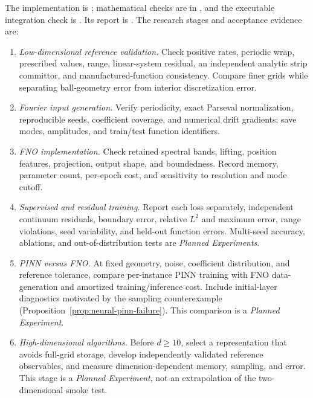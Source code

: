 \documentclass[12pt,a4paper,oneside]{book}
\begin{document}
The implementation is ; mathematical checks are in
, and the executable integration check is
. Its report is .
The research stages and acceptance evidence are:
\begin{enumerate}
 \item \emph{Low-dimensional reference validation.} Check positive rates, periodic wrap, prescribed values, range,
 linear-system residual, an independent analytic strip committor, and manufactured-function consistency.
 Compare finer grids while separating ball-geometry error from interior discretization error.
 \item \emph{Fourier input generation.} Verify periodicity, exact Parseval normalization, reproducible seeds,
 coefficient coverage, and numerical drift gradients; save modes, amplitudes, and train/test function identifiers.
 \item \emph{FNO implementation.} Check retained spectral bands, lifting, position features, projection, output shape,
 and boundedness. Record memory, parameter count, per-epoch cost, and sensitivity to resolution and mode cutoff.
 \item \emph{Supervised and residual training.} Report each loss separately, independent continuum residuals,
 boundary error, relative $L^2$ and maximum error, range violations, seed variability, and held-out function errors.
 Multi-seed accuracy, ablations, and out-of-distribution tests are \emph{Planned Experiments}.
 \item \emph{PINN versus FNO.} At fixed geometry, noise, coefficient distribution, and reference tolerance, compare
 per-instance PINN training with FNO data-generation and amortized training/inference cost. Include initial-layer
 diagnostics motivated by the sampling counterexample (Proposition~\ref{prop:neural-pinn-failure}).
 This comparison is a \emph{Planned Experiment}.
 \item \emph{High-dimensional algorithms.} Before $d\ge10$, select a representation that avoids full-grid storage,
 develop independently validated reference observables, and measure dimension-dependent memory, sampling, and error.
 This stage is a \emph{Planned Experiment}, not an extrapolation of the two-dimensional smoke test.
\end{enumerate}
\end{document}
